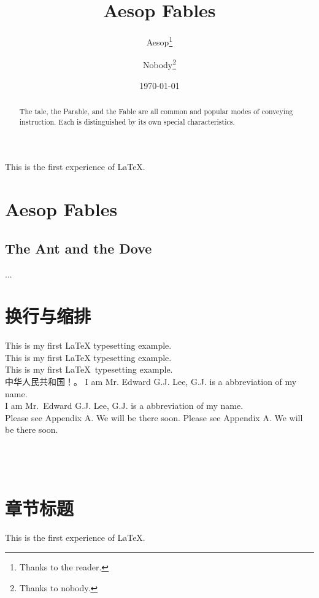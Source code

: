 \documentclass{report}
\title{Aesop Fables}
\author{Aesop\thanks{Thanks to the reader.}
       \and Nobody\thanks{Thanks to nobody.}}
\date{\today}
\begin{document}
\maketitle %

\begin{abstract}
The tale, the Parable, and the Fable are all common and popular
modes of conveying instruction. Each is distinguished by its own
special characteristics.
\end{abstract}

\tableofcontents %
This is the first experience of \LaTeX.
\chapter{Aesop Fables}
\section{The Ant and the Dove}
 ...


\chapter{换行与缩排}
\noindent %
This is my first {\LaTeX} typesetting example.\\[1cm] %
This is my first \LaTeX{} typesetting example.\\
This is my first \LaTeX\ typesetting example.\\

中华人民共和国！。
I am Mr. Edward G.J. Lee, G.J. is a abbreviation of my name.\\
I am Mr.\ Edward G.J. Lee, G.J. is a abbreviation of my name.\\
Please see Appendix A. We will be there soon.\linebreak %
Please see Appendix A\null. We will be there soon.\\\\\\\\


\chapter{章节标题}
This is the first experience of \LaTeX.
\end{document}
